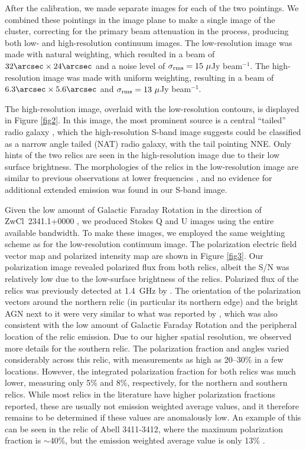 \documentclass[onecolumn]{aastex}
\begin{document}
After the calibration, we made separate images for each of the two pointings.  We combined these pointings in the image plane to make a single image of the cluster, correcting for the primary beam attenuation in the process, producing both low- and high-resolution continuum images.  The low-resolution image was made with natural weighting, which resulted in a beam of $32\arcsec \times 24\arcsec$ and a noise level of $\sigma_{\rm{rms}}= 15 ~\mu$Jy beam$^{-1}$.  The high-resolution image was made with uniform weighting, resulting in a beam of $6.3\arcsec \times 5.6\arcsec$ and $\sigma_{\rm{rms}}=13 ~\mu$Jy beam$^{-1}$.

The high-resolution image, overlaid with the low-resolution contours, is displayed in Figure \ref{fig2}.  In this image, the most prominent source is a central ``tailed'' radio galaxy \citep{vanWeeren09}, which the high-resolution S-band image suggests could be classified as a narrow angle tailed (NAT) radio galaxy, with the tail pointing NNE.  Only hints of the two relics are seen in the high-resolution image due to their low surface brightness.  The morphologies of the relics in the low-resolution image are similar to previous observations at lower frequencies \citep{Bagchi02, vanWeeren09, Giovannini10}, and no evidence for additional extended emission was found in our S-band image.

Given the low amount of Galactic Faraday Rotation in the direction of ZwCl~2341.1+0000 \citep[a Rotation Measure (RM) of $\approx -4$ rad m$^{-2}$][]{Taylor09}, we produced Stokes Q and U images using the entire available bandwidth.  To make these images, we employed the same weighting scheme as for the low-resolution continuum image.  The polarization electric field vector map and polarized intensity map are shown in Figure \ref{fig3}.  Our polarization image revealed polarized flux from both relics, albeit the S/N was relatively low due to the low-surface brightness of the relics.  Polarized flux of the relics was previously detected at 1.4~GHz by \cite{Giovannini10}.  The orientation of the polarization vectors around the northern relic (in particular its northern edge) and the bright AGN next to it  \citep{vanWeeren09} were very similar to what was reported by \cite{Giovannini10}, which was also consistent with the low amount of Galactic Faraday Rotation and the peripheral location of the relic emission.  Due to our higher spatial resolution, we observed more details for the southern relic.  The polarization fraction and angles varied considerably across this relic, with measurements as high as 20--30\% in a few locations.  However, the integrated polarization fraction for both relics was much lower, measuring only 5\% and  8\%, respectively, for the northern and southern relics.  While most relics in the literature have higher polarization fractions reported, these are usually not emission weighted average values, and it therefore remains to be determined if these values are anomalously low.  An example of this can be seen in the relic of Abell 3411-3412, where the maximum polarization fraction is $\sim$40\%, but the emission weighted average value is only 13\% \citep{vanWeeren17}.
\end{document}

